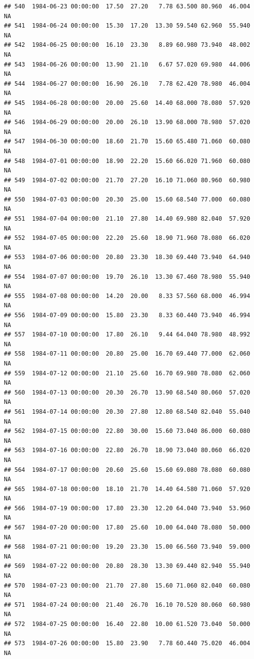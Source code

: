 \documentclass{article}\usepackage{graphicx, color}
\makeatletter
\newenvironment{kframe}{%
 \def\at@end@of@kframe{}%
 \ifinner\ifhmode%
  \def\at@end@of@kframe{\end{minipage}}%
  \begin{minipage}{\columnwidth}%
 \fi\fi%
 \def\FrameCommand##1{\hskip\@totalleftmargin \hskip-\fboxsep
 \colorbox{shadecolor}{##1}\hskip-\fboxsep
     \hskip-\linewidth \hskip-\@totalleftmargin \hskip\columnwidth}%
 \MakeFramed {\advance\hsize-\width
   \@totalleftmargin\z@ \linewidth\hsize
   \@setminipage}}%
 {\par\unskip\endMakeFramed%
 \at@end@of@kframe}
\newenvironment{knitrout}{}{} %
\makeatother
\begin{document}
\begin{knitrout}
\begin{kframe}
\begin{verbatim}
## 540  1984-06-23 00:00:00  17.50  27.20   7.78 63.500 80.960  46.004     NA
## 541  1984-06-24 00:00:00  15.30  17.20  13.30 59.540 62.960  55.940     NA
## 542  1984-06-25 00:00:00  16.10  23.30   8.89 60.980 73.940  48.002     NA
## 543  1984-06-26 00:00:00  13.90  21.10   6.67 57.020 69.980  44.006     NA
## 544  1984-06-27 00:00:00  16.90  26.10   7.78 62.420 78.980  46.004     NA
## 545  1984-06-28 00:00:00  20.00  25.60  14.40 68.000 78.080  57.920     NA
## 546  1984-06-29 00:00:00  20.00  26.10  13.90 68.000 78.980  57.020     NA
## 547  1984-06-30 00:00:00  18.60  21.70  15.60 65.480 71.060  60.080     NA
## 548  1984-07-01 00:00:00  18.90  22.20  15.60 66.020 71.960  60.080     NA
## 549  1984-07-02 00:00:00  21.70  27.20  16.10 71.060 80.960  60.980     NA
## 550  1984-07-03 00:00:00  20.30  25.00  15.60 68.540 77.000  60.080     NA
## 551  1984-07-04 00:00:00  21.10  27.80  14.40 69.980 82.040  57.920     NA
## 552  1984-07-05 00:00:00  22.20  25.60  18.90 71.960 78.080  66.020     NA
## 553  1984-07-06 00:00:00  20.80  23.30  18.30 69.440 73.940  64.940     NA
## 554  1984-07-07 00:00:00  19.70  26.10  13.30 67.460 78.980  55.940     NA
## 555  1984-07-08 00:00:00  14.20  20.00   8.33 57.560 68.000  46.994     NA
## 556  1984-07-09 00:00:00  15.80  23.30   8.33 60.440 73.940  46.994     NA
## 557  1984-07-10 00:00:00  17.80  26.10   9.44 64.040 78.980  48.992     NA
## 558  1984-07-11 00:00:00  20.80  25.00  16.70 69.440 77.000  62.060     NA
## 559  1984-07-12 00:00:00  21.10  25.60  16.70 69.980 78.080  62.060     NA
## 560  1984-07-13 00:00:00  20.30  26.70  13.90 68.540 80.060  57.020     NA
## 561  1984-07-14 00:00:00  20.30  27.80  12.80 68.540 82.040  55.040     NA
## 562  1984-07-15 00:00:00  22.80  30.00  15.60 73.040 86.000  60.080     NA
## 563  1984-07-16 00:00:00  22.80  26.70  18.90 73.040 80.060  66.020     NA
## 564  1984-07-17 00:00:00  20.60  25.60  15.60 69.080 78.080  60.080     NA
## 565  1984-07-18 00:00:00  18.10  21.70  14.40 64.580 71.060  57.920     NA
## 566  1984-07-19 00:00:00  17.80  23.30  12.20 64.040 73.940  53.960     NA
## 567  1984-07-20 00:00:00  17.80  25.60  10.00 64.040 78.080  50.000     NA
## 568  1984-07-21 00:00:00  19.20  23.30  15.00 66.560 73.940  59.000     NA
## 569  1984-07-22 00:00:00  20.80  28.30  13.30 69.440 82.940  55.940     NA
## 570  1984-07-23 00:00:00  21.70  27.80  15.60 71.060 82.040  60.080     NA
## 571  1984-07-24 00:00:00  21.40  26.70  16.10 70.520 80.060  60.980     NA
## 572  1984-07-25 00:00:00  16.40  22.80  10.00 61.520 73.040  50.000     NA
## 573  1984-07-26 00:00:00  15.80  23.90   7.78 60.440 75.020  46.004     NA

\end{verbatim}
\end{kframe}
\end{knitrout}
\end{document}
